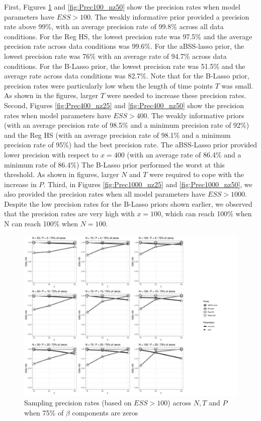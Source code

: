 \documentclass[a4paper,12pt]{article}
\begin{document}
First, Figures \ref{fig:Prec100_nz25} and \ref{fig:Prec100_nz50} show the precision rates when model parameters have $ESS > 100$. The weakly informative prior provided a precision rate above 99\%, with an average precision rate of 99.8\% across all data conditions. For the Reg HS, the lowest precision rate was 97.5\% and the average precision rate across data conditions was 99.6\%. For the aBSS-lasso prior, the lowest precision rate was 76\% with an average rate of 94.7\% across data conditions. For the B-Lasso prior, the lowest precision rate was 51.5\% and the average rate across data conditions was 82.7\%. Note that for the B-Lasso prior, precision rates were particularly low when the length of time points $T$ was small. As shown in the figures, larger $T$ were needed to increase these precision rates. Second, Figures \ref{fig:Prec400_nz25} and \ref{fig:Prec400_nz50} show the precision rates when model parameters have $ESS > 400$. The weakly informative priors (with an average precision rate of 98.5\% and a minimum precision rate of 92\%) and the Reg HS (with an average precision rate of 98.1\% and a minimum precision rate of 95\%) had the best precision rate. The aBSS-Lasso prior provided lower precision with respect to $x = 400$ (with an average rate of 86.4\% and a minimum rate of 86.4\%) The B-Lasso prior performed the worst at this threshold. As shown in figures, larger $N$ and $T$ were required to cope with the increase in $P$. Third, in Figures \ref{fig:Prec1000_nz25} and \ref{fig:Prec1000_nz50}, we also provided the precision rates when all model parameters have $ESS > 1000$. Despite the low precision rates for the B-Lasso priors shown earlier, we observed that the precision rates are very high with $x = 100$, which can reach 100\% when N can reach 100\% when $N = 100$. \\

\begin{figure}[h]
\centering 
\includegraphics[width=18cm]{Prec100_nz25_beta.jpg}
\caption{Sampling precision rates (based on $ESS>100$) across $N, T$ and $P$ when 75\% of $\beta$ components are zeros}
\label{fig:Prec100_nz25}
\end{figure}
\end{document}

